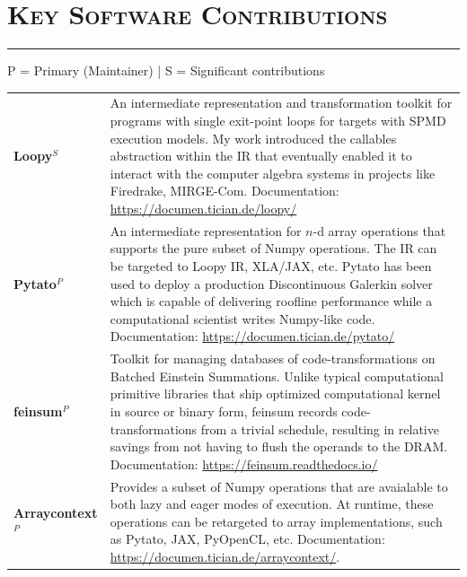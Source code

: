 \documentclass[letterpaper, 13pt]{article}
\begin{document}


\section*{\Large\textsc{Key Software Contributions}}

\vspace{-4ex}
\rule{\textwidth}{0.1ex}
{\scriptsize P = Primary (Maintainer) | S = Significant contributions}
\vspace{1ex}\\
\begin{tabular}{p{} p{}}
  \textbf{Loopy}$^S$ &
    An intermediate representation and transformation toolkit for programs with
    single exit-point loops for targets with SPMD execution models. My work
    introduced the callables abstraction within the IR that eventually enabled
    it to interact with the computer algebra systems in projects like Firedrake,
    MIRGE-Com. Documentation: \url{https://documen.tician.de/loopy/}\vspace{1ex}\\

  \textbf{Pytato}$^P$ &
    An intermediate representation for $n$-d array operations that supports the
    pure subset of Numpy operations. The IR can be targeted to Loopy IR,
    XLA/JAX, etc. Pytato has been used to deploy a production Discontinuous
    Galerkin solver which is capable of delivering roofline performance while a
    computational scientist writes Numpy-like code. Documentation:
    \url{https://documen.tician.de/pytato/}\vspace{1ex}\\

  \textbf{feinsum}$^P$ &
    Toolkit for managing databases of code-transformations on Batched Einstein
    Summations. Unlike typical computational primitive libraries that ship
    optimized computational kernel in source or binary form, feinsum records
    code- transformations from a trivial schedule, resulting in relative savings
    from not having to flush the operands to the DRAM. Documentation:
    \url{https://feinsum.readthedocs.io/}\vspace{1ex}\\

  \textbf{Arraycontext}$^P$ &
    Provides a subset of Numpy operations that are avaialable to both lazy and
    eager modes of execution. At runtime, these operations can be retargeted to
    array implementations, such as Pytato, JAX, PyOpenCL, etc.  Documentation:
    \url{https://documen.tician.de/arraycontext/}.\vspace{1ex}\\


\end{tabular}
\end{document}

